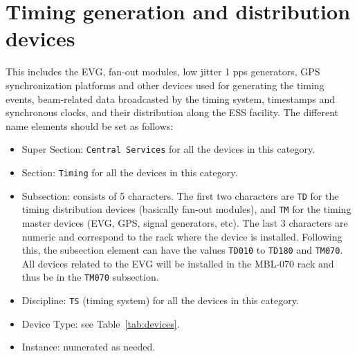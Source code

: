\documentclass[11pt
  , a4paper
  , article
  , oneside
  , showtrims
]{memoir}
\begin{document}
\section{Timing generation and distribution devices}
This includes the EVG, fan-out modules, low jitter 1 pps generators, GPS synchronization platforms and other devices used for generating the timing events, beam-related data broadcasted by the timing system, timestamps and synchronous clocks, and their distribution along the ESS facility. The different name elements should be set as follows:
\begin{itemize}
\item Super Section: \texttt{Central Services} for all the devices in this category.
\item Section: \texttt{Timing} for all the devices in this category.
\item Subsection: consists of 5 characters. The first two characters are \texttt{TD} for the timing distribution devices (basically fan-out modules), and  \texttt{TM} for the timing master devices (EVG, GPS, signal generators, etc). The last 3 characters are numeric and correspond to the rack where the device is installed. Following this, the subsection element can have the values \texttt{TD010} to \texttt{TD180} and \texttt{TM070}. All devices related to the EVG will be installed in the MBL-070 rack and thus be in the \texttt{TM070} subsection.
\item Discipline: \texttt{TS} (timing system) for all the devices in this category.
\item Device Type: see Table~\ref{tab:devices}.
\item Instance: numerated as needed.
\end{itemize}
\end{document}
